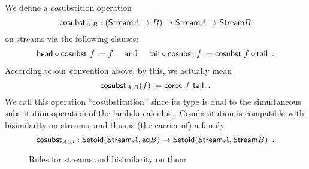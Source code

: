 \documentclass[a4paper,USenglish]{lipics}
\begin{document}
\begin{ex}
  We define a \emph{co}substition operation 
   \[\mathsf{cosubst}_{A,B} : (\mathsf{Stream} A \to B) \to \mathsf{Stream} A\to\mathsf{Stream} B\] 
   on streams via the following clauses:
% 
   \begin{align} {\ensuremath{\mathsf{head}}} \circ {\ensuremath{\mathsf{cosubst}}~f} := f \quad\text{ and } \quad
                  {\ensuremath{\mathsf{tail}}} \circ {\ensuremath{\mathsf{cosubst}}~f} := {\mathsf{cosubst}~f} \circ {\ensuremath{\mathsf{tail}}} \enspace . \label{eq:tail_sredec}
    \end{align}
  According to our convention above, by this, we actually mean
  \[  \mathsf{cosubst}_{A,B}(f) := \mathsf{corec}~f~\mathsf{tail} \enspace . \]
  We call this operation \enquote{cosubstitution} since its type is dual to the simultaneous substitution operation 
  of the lambda calculus \parencite{alt_reus}. 
  Cosubstitution is compatible with bisimilarity on streams, and thus is (the carrier of) a family
  \[ \mathsf{cosubst}_{A,B} : \mathsf{Setoid}(\mathsf{Stream} A, \mathsf{eq} B) \to \mathsf{Setoid}(\mathsf{Stream} A,\mathsf{Stream} B) \enspace . \]

\begin{figure}
 \begin{mdframed}
  
 \end{mdframed}
 \caption{Rules for streams and bisimilarity on them} \label{stream_rules}
\end{figure}

% 

\begin{comment}
  \begin{figure}[bt]
  \centering

     \def\extraVskip{3pt}
     \def\proofSkipAmount{\vskip.8ex plus.8ex minus.4ex}
    \AxiomC{$t : \stream A$} %
     \UnaryInfC{$\shead_A~t : A$}
      \DisplayProof
                        \hspace{3ex}
                                       \AxiomC{$t : \stream A$}%
                                       \UnaryInfC{$\stail_A~t : \stream A$}
                                       \DisplayProof%
% 
% 
% 
\hspace{3ex}
 \centering
                                            \def\extraVskip{3pt}
     \def\proofSkipAmount{\vskip.8ex plus.8ex minus.4ex}
    \AxiomC{$t \sim t'$} %
     \UnaryInfC{$\shead~t = \shead~t'$}
      \DisplayProof
                        \hspace{3ex}
                                       \AxiomC{$t \sim t'$} %
                                       \UnaryInfC{$ \stail~t \sim \stail~t'$}
                                       \DisplayProof   
  \caption{Destructors and bisimilarity for the coinductive family $\stream$} \label{fig:stream_destructors}
\end{figure}
\end{comment}
   

\end{ex}
\end{document}
